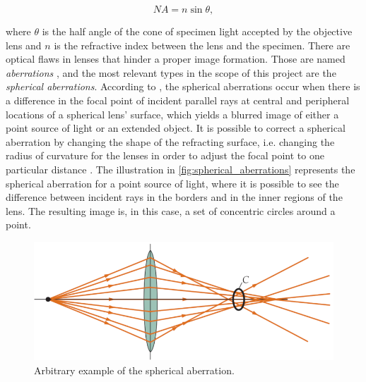 \begin{equation}
    \label{eqn:numerical_aperture}
    NA = n \sin{\theta},
\end{equation}

\noindent where $\theta$ is the half angle of the cone of specimen light accepted by the objective lens and $n$ is the refractive index between the lens and the specimen. There are optical flaws in lenses that hinder a proper image formation. Those are named \emph{aberrations} \cite{lawlor2019introduction}, and the most relevant types in the scope of this project are the \emph{spherical aberrations}. According to , the spherical aberrations occur when there is a difference in the focal point of incident parallel rays at central and peripheral locations of a spherical lens' surface, which yields a blurred image of either a point source of light or an extended object. It is possible to correct a spherical aberration by changing the shape of the refracting surface, i.e. changing the radius of curvature for the lenses in order to adjust the focal point to one particular distance \cite{smith1988optics}. The illustration in \autoref{fig:spherical_aberrations} represents the spherical aberration for a point source of light, where it is possible to see the difference between incident rays in the borders and in the inner regions of the lens. The resulting image is, in this case, a set of concentric circles around a point.

\begin{figure}[htb]
	\centering
	\caption{\label{fig:spherical_aberrations} Arbitrary example of the spherical aberration.}
	\begin{center}
	    \includegraphics[scale=1.5]{images/spherical_aberration.png}
	\end{center}
	\centering
\end{figure}

\vspace{-1cm}
